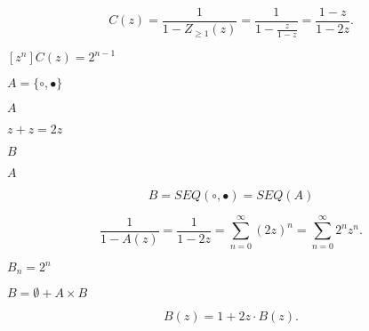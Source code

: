 \documentclass[10pt]{book}
\begin{document}
\begin{mdSnippets}
\begin{mdDisplaySnippet}[36219a14f7414d3c3884512d6012ec17]%
\[%
 C(z)=\frac{1}{1-Z_{\geq1}(z)}=\frac{1}{1-\frac{z}{1-z}}=\frac{1-z}{1-2z}.
\]%
\end{mdDisplaySnippet}%
\begin{mdInlineSnippet}[4bb8eae0518784707e4f9d6a8d60e295]%
$[z^n]C(z)=2^{n-1}$\end{mdInlineSnippet}%
\begin{mdInlineSnippet}[fca55d2328dc748f13ca41b98911074e]%
$A = \{\circ,\bullet\}$\end{mdInlineSnippet}%
\begin{mdInlineSnippet}[7fc56270e7a70fa81a5935b72eacbe29]%
$A$\end{mdInlineSnippet}%
\begin{mdInlineSnippet}%
$z + z=2z$\end{mdInlineSnippet}%
\begin{mdInlineSnippet}%
$B$\end{mdInlineSnippet}%
\begin{mdInlineSnippet}[7fc56270e7a70fa81a5935b72eacbe29]%
$A$\end{mdInlineSnippet}%
\begin{mdDisplaySnippet}[78d6c064ae66b0f4dfe88cc53eb7691d]%
\[%
B = SEQ(\circ,\bullet)=SEQ(A)
\]%
\end{mdDisplaySnippet}%
\begin{mdDisplaySnippet}%
\[%
\frac{1}{1-A(z)}=\frac{1}{1-2z} = \sum_{n=0}^\infty (2z)^n=\sum_{n=0}^\infty 2^nz^n.
\]%
\end{mdDisplaySnippet}%
\begin{mdInlineSnippet}[40e5fb314fd79f999e5c45f397317655]%
$B_n=2^n$\end{mdInlineSnippet}%
\begin{mdInlineSnippet}[2e316beb75845dc29e752d522d1c77c8]%
$B = \emptyset + A \times B$\end{mdInlineSnippet}%
\begin{mdDisplaySnippet}[3359a0ee5a38412f5b8a9a46108a25b2]%
\[%
B(z) = 1 + 2z\cdot B(z).
\]
\end{mdDisplaySnippet}
\end{mdSnippets}
\end{document}
